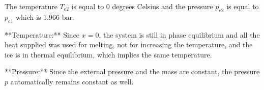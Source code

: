 The temperature \( T_{e2} \) is equal to 0 degrees Celsius and the pressure \( p_{e2} \) is equal to \( p_{e1} \) which is 1.966 bar.

**Temperature:** Since \( x = 0 \), the system is still in phase equilibrium and all the heat supplied was used for melting, not for increasing the temperature, and the ice is in thermal equilibrium, which implies the same temperature.

**Pressure:** Since the external pressure and the mass are constant, the pressure \( p \) automatically remains constant as well.